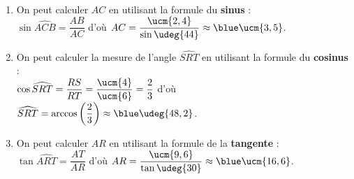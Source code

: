 \ \\ [-5mm]
   \begin{enumerate}
      \item On peut calculer $AC$ en utilisant la formule du \textbf{sinus} : \\ [1mm]
         $\sin\widehat{ACB}=\dfrac{AB}{AC}$ d'où $AC =\dfrac{\ucm{2,4}}{\sin \udeg{44}} \approx {\blue  \ucm{3,5}}$. \smallskip
      \item On peut calculer la mesure de l'angle $\widehat{SRT}$ en utilisant la formule du \textbf{cosinus} : \\ [1mm]
         $\cos \widehat{SRT}=\dfrac{RS}{RT} =\dfrac{\ucm{4}}{\ucm{6}} =\dfrac23$ d'où $\widehat{SRT} =\arccos\left(\dfrac23\right) \approx {\blue \udeg{48,2}}$. \smallskip
      \item On peut calculer $AR$ en utilisant la formule de la \textbf{tangente} : \\ [1mm]
         $\tan\widehat{ART}=\dfrac{AT}{AR}$ d'où $AR =\dfrac{\ucm{9,6}}{\tan \udeg{30}} \approx {\blue \ucm{16,6}}$.
   \end{enumerate}
